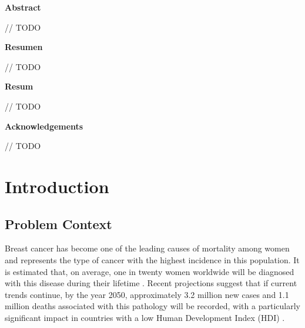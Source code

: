 \documentclass[a4paper,10pt]{book}
\begin{document}
\newpage
{}
\noindent \textbf{\large Abstract}

// TODO


\newpage
{}
\noindent \textbf{\large Resumen}

// TODO


\newpage
{}
\noindent \textbf{\large Resum}

// TODO

\newpage
{}
\noindent \textbf{\large Acknowledgements}

// TODO
 \setcounter{page}{0}
\let\cleardoublepage\clearpage
\tableofcontents
\newpage \thispagestyle{empty}

\pagestyle{fancy}
\newpage \thispagestyle{empty}
\mainmatter
\chapter{Introduction}
\section{Problem Context}

Breast cancer has become one of the leading causes of mortality among women and represents the type of cancer with the highest incidence in this population. It is estimated that, on average, one in twenty women worldwide will be diagnosed with this disease during their lifetime \cite{kim_global_2025}. Recent projections suggest that if current trends continue, by the year 2050, approximately 3.2 million new cases and 1.1 million deaths associated with this pathology will be recorded, with a particularly significant impact in countries with a low Human Development Index (HDI) \cite{kim_global_2025}.
\end{document}
